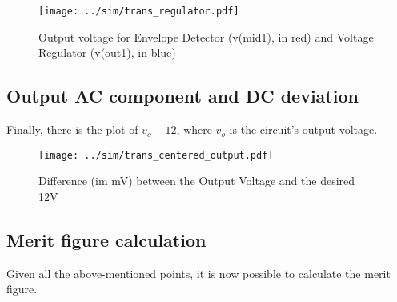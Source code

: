 \begin{figure}[H] \centering
\texttt{[image: ../sim/trans\_regulator.pdf]}
\caption{Output voltage for Envelope Detector (v(mid1), in red) and Voltage Regulator (v(out1), in blue)}
\label{fig:phase_sim}
\end{figure}


\subsection{Output AC component and DC deviation}
Finally, there is the plot of $v_o -12$, where $v_o$ is the circuit's output voltage.


\begin{figure}[H] \centering
\texttt{[image: ../sim/trans\_centered\_output.pdf]}
\caption{Difference (im mV) between the Output Voltage and the desired 12V}
\label{fig:phase_sim}
\end{figure}


\subsection{Merit figure calculation}
Given all the above-mentioned points, it is now possible to calculate the merit figure.

